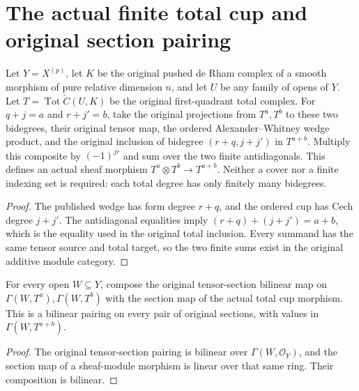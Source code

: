 \section{The actual finite total cup and original section pairing}

\begin{definition}
\label{def:di-cech-total-cup}
\leanok
{}
Let $Y=X^{(p)}$, let $K$ be the original pushed de Rham complex
of a smooth morphism of pure relative dimension $n$, and let $U$ be any
family of opens of $Y$. Let $T=\operatorname{Tot}\check C(U,K)$ be the
original first-quadrant total complex. For $q+j=a$ and $r+j'=b$, take
the original projections from $T^a,T^b$ to these two bidegrees, their
original tensor map, the ordered Alexander--Whitney wedge product,
and the original inclusion of bidegree $(r+q,j+j')$ in $T^{a+b}$.
Multiply this composite by $(-1)^{jr}$ and sum over the two finite
antidiagonals. This defines an actual sheaf morphism
$T^a\otimes T^b\to T^{a+b}$. Neither a cover nor a finite indexing
set is required: each total degree has only finitely many bidegrees.
\end{definition}
\begin{proof}
The published wedge has form degree $r+q$, and the ordered cup has
Cech degree $j+j'$. The antidiagonal equalities imply
$(r+q)+(j+j')=a+b$, which is the equality used in the original total
inclusion. Every summand has the same tensor source and total target,
so the two finite sums exist in the original additive module category.
\end{proof}

\begin{definition}
\label{def:di-cech-total-cup-section}
\leanok
{}
For every open $W\subseteq Y$, compose the original tensor-section
bilinear map on $\Gamma(W,T^a),\Gamma(W,T^b)$ with the section map
of the actual total cup morphism. This is a bilinear pairing on every
pair of original sections, with values in $\Gamma(W,T^{a+b})$.
\end{definition}
\begin{proof}
The original tensor-section pairing is bilinear over
$\Gamma(W,\mathcal O_Y)$, and the section map of a sheaf-module
morphism is linear over that same ring. Their composition is bilinear.
\end{proof}

